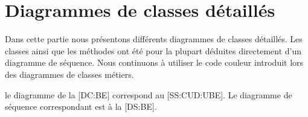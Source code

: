 \chapter{Diagrammes de classes détaillés}

Dans cette partie nous présentons différents diagrammes de classes détaillés.
Les classes ainsi que les méthodes ont été pour la plupart déduites directement d'un diagramme de séquence.
Nous continuons à utiliser le code couleur introduit lors des diagrammes de classes métiers.

\startitemize
\item le diagramme de la [DC:BE] correspond au \in{\cu}[SS:CUD:UBE].
Le diagramme de séquence correspondant est à la [DS:BE].
\stopitemize

